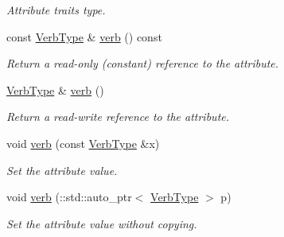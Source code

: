 \begin{DoxyCompactItemize}
\begin{DoxyCompactList}\small\item\em Attribute traits type. \item\end{DoxyCompactList}\item 
const \hyperlink{classopenstack_1_1xml_1_1HTTPVerb}{VerbType} \& \hyperlink{classopenstack_1_1xml_1_1RateLimit_aa8ba46837d1d8c1decf29dc48e60ea56}{verb} () const 
\begin{DoxyCompactList}\small\item\em Return a read-\/only (constant) reference to the attribute. \item\end{DoxyCompactList}\item 
\hyperlink{classopenstack_1_1xml_1_1HTTPVerb}{VerbType} \& \hyperlink{classopenstack_1_1xml_1_1RateLimit_ad36bcf07eb0299ed568b8bf76c7a3ae6}{verb} ()
\begin{DoxyCompactList}\small\item\em Return a read-\/write reference to the attribute. \item\end{DoxyCompactList}\item 
void \hyperlink{classopenstack_1_1xml_1_1RateLimit_a2e57ad126d94339314507f6ccf6b567f}{verb} (const \hyperlink{classopenstack_1_1xml_1_1HTTPVerb}{VerbType} \&x)
\begin{DoxyCompactList}\small\item\em Set the attribute value. \item\end{DoxyCompactList}\item 
void \hyperlink{classopenstack_1_1xml_1_1RateLimit_a22d9bcaac627ed869e977c948f13b532}{verb} (::std::auto\_\-ptr$<$ \hyperlink{classopenstack_1_1xml_1_1HTTPVerb}{VerbType} $>$ p)
\begin{DoxyCompactList}\small\item\em Set the attribute value without copying. \item\end{DoxyCompactList}\end{DoxyCompactItemize}
